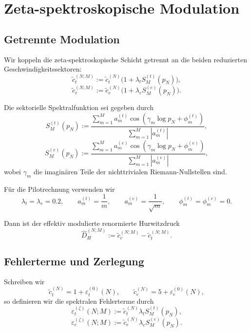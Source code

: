 \documentclass[a4paper,12pt]{article}
\theoremstyle{definition}
\numberwithin{equation}{section}
\begin{document}
	\section{Zeta-spektroskopische Modulation}
	
	\subsection{Getrennte Modulation}
	
	Wir koppeln die zeta-spektroskopische Schicht getrennt an die beiden reduzierten Geschwindigkeitssektoren:
	\begin{equation}
		\tilde c_t^{(N;M)}
		:=
		\tilde c_t^{(N)}\bigl(1+\lambda_t S_M^{(t)}(p_N)\bigr),
	\end{equation}
	\begin{equation}
		\tilde c_e^{(N;M)}
		:=
		\tilde c_e^{(N)}\bigl(1+\lambda_e S_M^{(e)}(p_N)\bigr).
	\end{equation}
	
	Die sektorielle Spektralfunktion sei gegeben durch
	\begin{equation}
		S_M^{(t)}(p_N)
		:=
		\frac{\sum_{m=1}^{M} a_m^{(t)}\cos(\gamma_m\log p_N+\phi_m^{(t)})}
		{\sum_{m=1}^{M}|a_m^{(t)}|},
	\end{equation}
	\begin{equation}
		S_M^{(e)}(p_N)
		:=
		\frac{\sum_{m=1}^{M} a_m^{(e)}\cos(\gamma_m\log p_N+\phi_m^{(e)})}
		{\sum_{m=1}^{M}|a_m^{(e)}|},
	\end{equation}
	wobei \(\gamma_m\) die imaginären Teile der nichttrivialen Riemann-Nullstellen sind.
	
	Für die Pilotrechnung verwenden wir
	\[
	\lambda_t=\lambda_e=0.2,
	\qquad
	a_m^{(t)}=\frac1m,
	\qquad
	a_m^{(e)}=\frac1{\sqrt m},
	\qquad
	\phi_m^{(t)}=\phi_m^{(e)}=0.
	\]
	
	Dann ist der effektiv modulierte renormierte Hurwitzdruck
	\[
	\widehat D_H^{(N;M)}:=\tilde c_e^{(N;M)}-\tilde c_t^{(N;M)}.
	\]
	
	\subsection{Fehlerterme und Zerlegung}
	
	Schreiben wir
	\[
	\tilde c_t^{(N)}=1+\varepsilon_t^{(0)}(N),
	\qquad
	\tilde c_e^{(N)}=5+\varepsilon_e^{(0)}(N),
	\]
	so definieren wir die spektralen Fehlerterme durch
	\[
	\varepsilon_t^{(\zeta)}(N;M)
	:=
	\tilde c_t^{(N)}\lambda_t S_M^{(t)}(p_N),
	\]
	\[
	\varepsilon_e^{(\zeta)}(N;M)
	:=
	\tilde c_e^{(N)}\lambda_e S_M^{(e)}(p_N).
	\]
	
\end{document}
